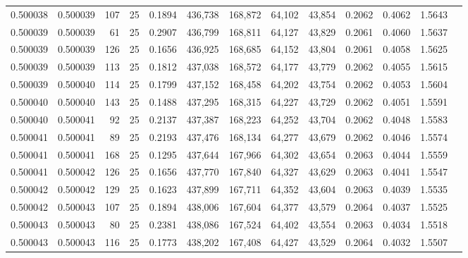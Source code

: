 \begin{tabular}{rrrrrrrrrrrrr}
0.500038 & 0.500039 & 107 &  25 &                                     0.1894 & 436,738 & 168,872 &  64,102 &  43,854 & 0.2062 & 0.4062 & 1.5643 \\
0.500039 & 0.500039 &  61 &  25 &                                     0.2907 & 436,799 & 168,811 &  64,127 &  43,829 & 0.2061 & 0.4060 & 1.5637 \\
0.500039 & 0.500039 & 126 &  25 &                                     0.1656 & 436,925 & 168,685 &  64,152 &  43,804 & 0.2061 & 0.4058 & 1.5625 \\
0.500039 & 0.500039 & 113 &  25 &                                     0.1812 & 437,038 & 168,572 &  64,177 &  43,779 & 0.2062 & 0.4055 & 1.5615 \\
0.500039 & 0.500040 & 114 &  25 &                                     0.1799 & 437,152 & 168,458 &  64,202 &  43,754 & 0.2062 & 0.4053 & 1.5604 \\
0.500040 & 0.500040 & 143 &  25 &                                     0.1488 & 437,295 & 168,315 &  64,227 &  43,729 & 0.2062 & 0.4051 & 1.5591 \\
0.500040 & 0.500041 &  92 &  25 &                                     0.2137 & 437,387 & 168,223 &  64,252 &  43,704 & 0.2062 & 0.4048 & 1.5583 \\
0.500041 & 0.500041 &  89 &  25 &                                     0.2193 & 437,476 & 168,134 &  64,277 &  43,679 & 0.2062 & 0.4046 & 1.5574 \\
0.500041 & 0.500041 & 168 &  25 &                                     0.1295 & 437,644 & 167,966 &  64,302 &  43,654 & 0.2063 & 0.4044 & 1.5559 \\
0.500041 & 0.500042 & 126 &  25 &                                     0.1656 & 437,770 & 167,840 &  64,327 &  43,629 & 0.2063 & 0.4041 & 1.5547 \\
0.500042 & 0.500042 & 129 &  25 &                                     0.1623 & 437,899 & 167,711 &  64,352 &  43,604 & 0.2063 & 0.4039 & 1.5535 \\
0.500042 & 0.500043 & 107 &  25 &                                     0.1894 & 438,006 & 167,604 &  64,377 &  43,579 & 0.2064 & 0.4037 & 1.5525 \\
0.500043 & 0.500043 &  80 &  25 &                                     0.2381 & 438,086 & 167,524 &  64,402 &  43,554 & 0.2063 & 0.4034 & 1.5518 \\
0.500043 & 0.500043 & 116 &  25 &                                     0.1773 & 438,202 & 167,408 &  64,427 &  43,529 & 0.2064 & 0.4032 & 1.5507 \\

\end{tabular}
